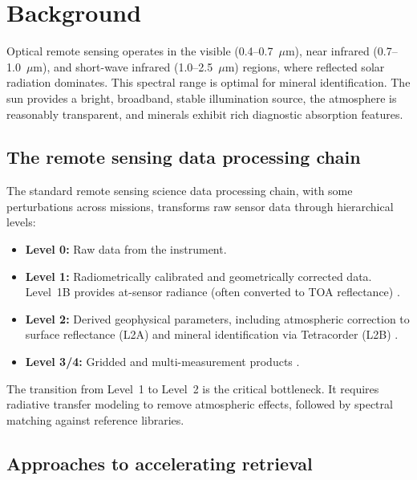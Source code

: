\documentclass[preprint,12pt]{elsarticle}
\begin{document}
\section{Background}
\label{sec:background}

Optical remote sensing operates in the visible (0.4--0.7~$\mu$m), near infrared (0.7--1.0~$\mu$m), and short-wave infrared (1.0--2.5~$\mu$m) regions, where reflected solar radiation dominates. 
This spectral range is optimal for mineral identification. 
The sun provides a bright, broadband, stable illumination source, the atmosphere is reasonably transparent, and minerals exhibit rich diagnostic absorption features.

\subsection{The remote sensing data processing chain}

The standard remote sensing science data processing chain, with some perturbations across missions, transforms raw sensor data through hierarchical levels:
\begin{itemize}
  \item \textbf{Level 0:} Raw data from the instrument.
  \item \textbf{Level 1:} Radiometrically calibrated and geometrically corrected data. Level~1B provides at-sensor radiance (often converted to TOA reflectance) \cite{emit_l1b_atbd}.
  \item \textbf{Level 2:} Derived geophysical parameters, including atmospheric correction to surface reflectance (L2A) \cite{emit_l2a_atbd} and mineral identification via Tetracorder (L2B) \cite{emit_l2b_atbd}.
  \item \textbf{Level 3/4:} Gridded and multi-measurement products \cite{emit_l3_atbd}.
\end{itemize}

The transition from Level~1 to Level~2 is the critical bottleneck.
It requires radiative transfer modeling to remove atmospheric effects, followed by spectral matching against reference libraries.

\subsection{Approaches to accelerating retrieval}
\label{sec:rtm_emulation}
\end{document}
